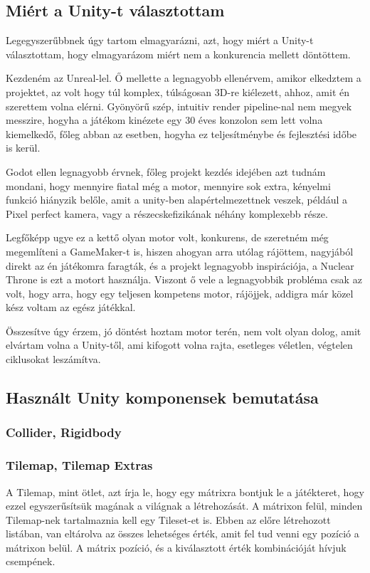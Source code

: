 \documentclass[
]{thesis-ekf}
\theoremstyle{definition}
\theoremstyle{remark}
\begin{document}
	\subsection{Miért a Unity-t választottam}
	Legegyszerűbbnek úgy tartom elmagyarázni, azt, hogy miért a Unity-t választottam, hogy elmagyarázom miért nem a konkurencia mellett döntöttem.
	
	Kezdeném az Unreal-lel. Ő mellette a legnagyobb ellenérvem, amikor elkedztem a projektet, az volt hogy túl komplex, túlságosan 3D-re kiélezett, ahhoz, amit én szerettem volna elérni. Gyönyörű szép, intuitiv render pipeline-nal nem megyek messzire, hogyha a játékom kinézete egy 30 éves konzolon sem lett volna kiemelkedő, főleg abban az esetben, hogyha ez teljesítménybe és fejlesztési időbe is kerül.
	
	Godot ellen legnagyobb érvnek, főleg projekt kezdés idejében azt tudnám mondani, hogy mennyire fiatal még a motor, mennyire sok extra, kényelmi funkció hiányzik belőle, amit a unity-ben alapértelmezettnek veszek, például a Pixel perfect kamera, vagy a részecskefizikának néhány komplexebb része.
	
	Legfőképp ugye ez a kettő olyan motor volt, konkurens, de szeretném még megemlíteni a GameMaker-t is, hiszen ahogyan arra utólag rájöttem, nagyjából direkt az én játékomra faragták, és a projekt legnagyobb inspirációja, a Nuclear Throne is ezt a motort használja. Viszont ő vele a legnagyobbik probléma csak az volt, hogy arra, hogy egy teljesen kompetens motor, rájöjjek, addigra már közel kész voltam az egész játékkal.
	
	Összesítve úgy érzem, jó döntést hoztam motor terén, nem volt olyan dolog, amit elvártam volna a Unity-től, ami kifogott volna rajta, esetleges véletlen, végtelen ciklusokat leszámítva.
	
	\subsection{Használt Unity komponensek bemutatása}
	
	\subsubsection{Collider, Rigidbody}
	
	\subsubsection{Tilemap, Tilemap Extras}
	A Tilemap, mint ötlet, azt írja le, hogy egy mátrixra bontjuk le a játékteret, hogy ezzel egyszerűsítsük magának a világnak a létrehozását.
	A mátrixon felül, minden Tilemap-nek tartalmaznia kell egy Tileset-et is. Ebben az előre létrehozott listában, van eltárolva az összes lehetséges érték, amit fel tud venni egy pozíció a mátrixon belül. A mátrix pozíció, és a kiválasztott érték kombinációját hívjuk csempének.
	
\end{document}
